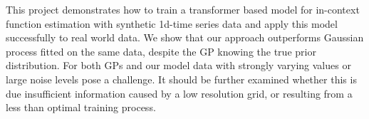 This project demonstrates how to train a transformer based model for in-context function estimation with synthetic 1d-time series data and apply this model successfully to real world data. We show that our approach outperforms Gaussian process fitted on the same data, despite the GP knowing the true prior distribution. For both GPs and our model data with strongly varying values or large noise levels pose a challenge. It should be further examined whether this is due insufficient information caused by a low resolution grid, or resulting from a less than optimal training process.